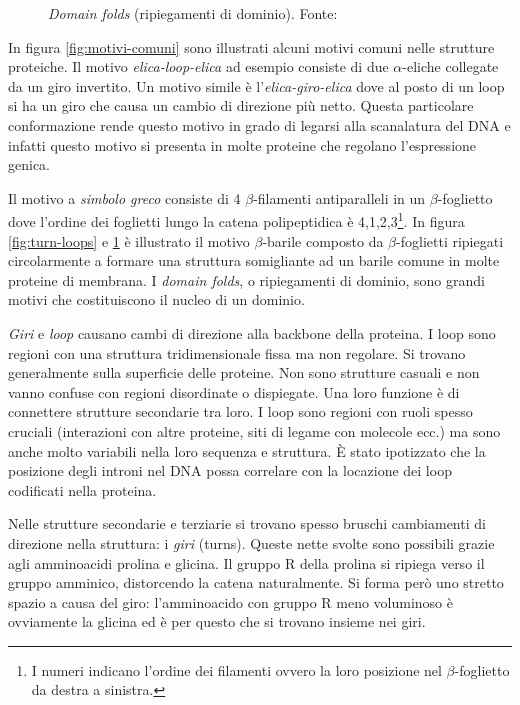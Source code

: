 {{\begin{figure}[!htb]
	\caption{\textit{Domain folds} (ripiegamenti di dominio). Fonte: \cite{moran2012principles}}
	\label{fig:domain-folds}
	\endminipage\hfill
	
\end{figure}

\par In figura \ref{fig:motivi-comuni} sono illustrati alcuni motivi comuni nelle strutture proteiche. 
Il motivo \textit{elica-loop-elica} ad esempio consiste di due $\alpha$-eliche collegate da un giro invertito. Un motivo simile è l'\textit{elica-giro-elica} dove al posto di un loop si ha un giro che causa un cambio di direzione più netto. Questa particolare conformazione rende questo motivo in grado di legarsi alla scanalatura del DNA e infatti questo motivo si presenta in molte proteine che regolano l'espressione genica.

\par Il motivo a \textit{simbolo greco} consiste di 4 $\beta$-filamenti antiparalleli in un $\beta$-foglietto dove l'ordine dei foglietti lungo la catena polipeptidica è 4,1,2,3\footnote{I numeri indicano l'ordine dei filamenti ovvero la loro posizione nel $\beta$-foglietto da destra a sinistra.}. In figura \ref{fig:turn-loops} e \ref{fig:domain-folds} è illustrato il motivo $\beta$-barile composto da $\beta$-foglietti ripiegati circolarmente a formare una struttura somigliante ad un barile comune in molte proteine di membrana. I \textit{domain folds}, o ripiegamenti di dominio, sono grandi motivi che costituiscono il nucleo di un dominio.

\par \textit{Giri} e \textit{loop} causano cambi di direzione alla backbone della proteina. I loop sono regioni con una struttura tridimensionale fissa ma non regolare. Si trovano generalmente sulla superficie delle proteine. Non sono strutture casuali e non vanno confuse con regioni disordinate o dispiegate. Una loro funzione è di connettere strutture secondarie tra loro. I loop sono regioni con ruoli spesso cruciali (interazioni con altre proteine, siti di legame con molecole ecc.) ma sono anche molto variabili nella loro sequenza e struttura. È stato ipotizzato che la posizione degli introni nel DNA possa correlare con la locazione dei loop codificati nella proteina\supercite{PSPwiki}.

\par Nelle strutture secondarie e terziarie si trovano spesso bruschi cambiamenti di direzione nella struttura: i \textit{giri} (turns). Queste nette svolte sono possibili grazie agli amminoacidi prolina e glicina. Il gruppo R della prolina si ripiega verso il gruppo amminico, distorcendo la catena naturalmente. Si forma però uno stretto spazio a causa del giro: l'amminoacido con gruppo R meno voluminoso è ovviamente la glicina ed è per questo che si trovano insieme nei giri.

}}
